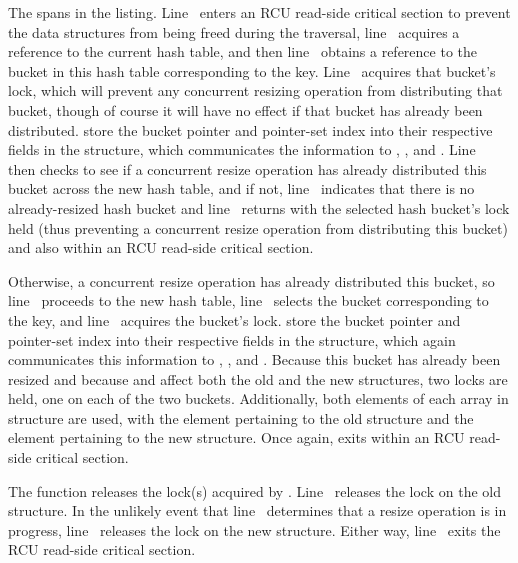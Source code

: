 \begin{fcvref}
The  spans
 in the listing.
Line~ enters an RCU read-side critical section to prevent
the data structures from being freed during the traversal,
line~ acquires a reference to the current hash table, and then
line~ obtains a reference to the bucket in this hash table
corresponding to the key.
Line~ acquires that bucket's lock, which will prevent any concurrent
resizing operation from distributing that bucket, though of course it
will have no effect if that bucket has already been distributed.
 store the bucket pointer and
pointer-set index into their respective fields in the
 structure, which communicates the information to
, , and .
Line~ then checks to see if a concurrent resize
operation has already distributed this bucket across the new hash table,
and if not, line~ indicates that there is no
already-resized hash bucket and
line~ returns with the selected hash bucket's
lock held (thus preventing a concurrent resize operation from distributing
this bucket) and also within an RCU read-side critical section.

Otherwise, a concurrent resize operation has already distributed this
bucket, so line~ proceeds to the new hash table,
line~ selects the bucket corresponding to the key,
and line~ acquires the bucket's lock.
 store the bucket pointer and
pointer-set index into their respective fields in the
 structure, which again communicates this information to
, , and .
Because this bucket has already been resized and because
 and  affect both the old and the
new  structures, two locks are held, one on each of the
two buckets.
Additionally, both elements of each array in  structure
are used, with the \co{[0]} element pertaining to the old 
structure and the \co{[1]} element pertaining to the new structure.
Once again,  exits within an RCU read-side critical
section.
\end{fcvref}

\begin{fcvref}
The  function releases the lock(s) acquired by
.
Line~ releases the lock on the old  structure.
In the unlikely event that line~ determines that a resize
operation is in progress, line~ releases the lock on the
new  structure.
Either way, line~ exits the RCU read-side critical
section.
\end{fcvref}

